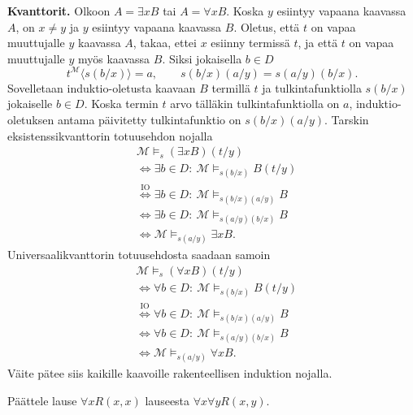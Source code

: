 \documentclass[11pt,a4paper]{amsart}
\begin{document}
\begin{solution}
  \textbf{Kvanttorit.} Olkoon \(A=\exists xB\) tai \(A=\forall xB\).
  Koska \(y\) esiintyy vapaana kaavassa \(A\), on \(x\ne y\) ja
  \(y\) esiintyy vapaana kaavassa \(B\). Oletus, että \(t\) on vapaa
  muuttujalle \(y\) kaavassa \(A\), takaa, ettei \(x\) esiinny
  termissä \(t\), ja että \(t\) on vapaa muuttujalle \(y\) myös
  kaavassa \(B\).
  Siksi jokaisella \(b\in D\)
  \[
    t^{\mathcal M}\langle s(b/x)\rangle=a,
    \qquad s(b/x)(a/y)=s(a/y)(b/x).
  \]
  Sovelletaan induktio-oletusta kaavaan \(B\) termillä \(t\) ja
  tulkintafunktiolla \(s(b/x)\) jokaiselle \(b\in D\). Koska termin
  \(t\) arvo tälläkin tulkintafunktiolla on \(a\), induktio-oletuksen
  antama päivitetty tulkintafunktio on \(s(b/x)(a/y)\).
  Tarskin eksistenssikvanttorin totuusehdon nojalla
  \[
    \begin{aligned}
      &\mathcal M\models_s(\exists xB)(t/y)\\
      &\iff \exists b\in D:\ \mathcal M\models_{s(b/x)}B(t/y)\\
      &\overset{\text{IO}}{\iff} \exists b\in D:\
      \mathcal M\models_{s(b/x)(a/y)}B\\
      &\iff \exists b\in D:\ \mathcal M\models_{s(a/y)(b/x)}B\\
      &\iff \mathcal M\models_{s(a/y)}\exists xB.
    \end{aligned}
  \]
  Universaalikvanttorin totuusehdosta saadaan samoin
  \[
    \begin{aligned}
      &\mathcal M\models_s(\forall xB)(t/y)\\
      &\iff \forall b\in D:\ \mathcal M\models_{s(b/x)}B(t/y)\\
      &\overset{\text{IO}}{\iff} \forall b\in D:\
      \mathcal M\models_{s(b/x)(a/y)}B\\
      &\iff \forall b\in D:\ \mathcal M\models_{s(a/y)(b/x)}B\\
      &\iff \mathcal M\models_{s(a/y)}\forall xB.
    \end{aligned}
  \]
  Väite pätee siis kaikille kaavoille rakenteellisen induktion nojalla.\qedhere
\end{solution}

\begin{exercise}
  Päättele lause \(\forall xR(x,x)\) lauseesta \(\forall x\forall yR(x,y)\).
\end{exercise}
\end{document}
